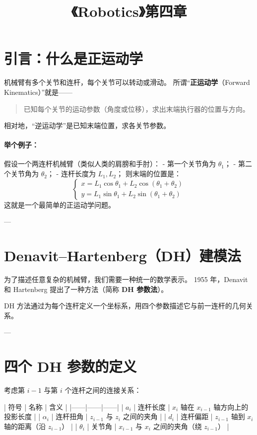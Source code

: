 \documentclass[12pt,a4paper]{article}
\title{《Robotics》第四章}
\author{}
\date{}
\begin{document}
\maketitle

\section{引言：什么是正运动学}
机械臂有多个关节和连杆，每个关节可以转动或滑动。  
所谓“\textbf{正运动学}（Forward Kinematics）”就是——  
\begin{quote}
已知每个关节的运动参数（角度或位移），求出末端执行器的位置与方向。
\end{quote}

\noindent
相对地，“逆运动学”是已知末端位置，求各关节参数。

\paragraph{举个例子：}
假设一个两连杆机械臂（类似人类的肩膀和手肘）：
- 第一个关节角为 $\theta_1$；
- 第二个关节角为 $\theta_2$；
- 连杆长度为 $L_1, L_2$；
则末端的位置是：
\[
\begin{cases}
x = L_1\cos\theta_1 + L_2\cos(\theta_1+\theta_2)\\
y = L_1\sin\theta_1 + L_2\sin(\theta_1+\theta_2)
\end{cases}
\]
这就是一个最简单的正运动学问题。

---

\section{Denavit–Hartenberg（DH）建模法}
为了描述任意复杂的机械臂，我们需要一种统一的数学表示。  
1955 年，Denavit 和 Hartenberg 提出了一种方法（简称 \textbf{DH 参数法}）。

DH 方法通过为每个连杆定义一个坐标系，用四个参数描述它与前一连杆的几何关系。

---

\section{四个 DH 参数的定义}
考虑第 $i-1$ 与第 $i$ 个连杆之间的连接关系：

| 符号 | 名称 | 含义 |
|------|------|------|
| \(a_i\) | 连杆长度 | $x_i$ 轴在 $x_{i-1}$ 轴方向上的投影长度 |
| \(\alpha_i\) | 连杆扭角 | $z_{i-1}$ 与 $z_i$ 之间的夹角 |
| \(d_i\) | 连杆偏距 | $z_{i-1}$ 轴到 $x_i$ 轴的距离（沿 $z_{i-1}$） |
| \(\theta_i\) | 关节角 | $x_{i-1}$ 与 $x_i$ 之间的夹角（绕 $z_{i-1}$） |
\end{document}
